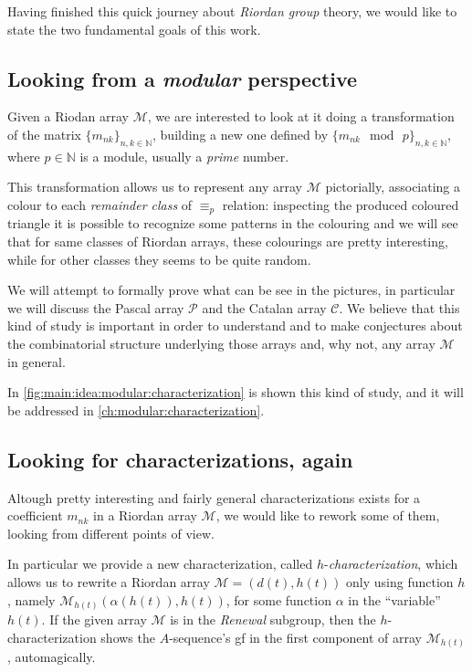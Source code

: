 
Having finished this quick journey about \emph{Riordan group} theory,
we would like to state the two fundamental goals of this work.

\subsection{Looking from a \emph{modular} perspective}

Given a Riodan array $\mathcal{M}$, we are interested to look at it
doing a transformation of the matrix $\lbrace m_{nk}\rbrace_{n,k\in\mathbb{N}}$,
building a new one defined by $\lbrace m_{nk}\mod\,p\rbrace_{n,k\in\mathbb{N}}$,
where $p\in\mathbb{N}$ is a module, usually a \emph{prime} number.

This transformation allows us to represent any array $\mathcal{M}$ pictorially,
associating a colour to each \emph{remainder class} of $\equiv_{p}$ relation:
inspecting the produced coloured triangle it is possible to recognize some
patterns in the colouring and we will see that for same classes of Riordan
arrays, these colourings are pretty interesting, while for other classes they
seems to be quite random.

We will attempt to formally prove what can be see in the pictures, in
particular we will discuss the Pascal array $\mathcal{P}$ and the Catalan array
$\mathcal{C}$.  We believe that this kind of study is important in order to
understand and to make conjectures about the combinatorial structure underlying
those arrays and, why not, any array $\mathcal{M}$ in general.



In \autoref{fig:main:idea:modular:characterization} is shown this kind of study,
and it will be addressed in \autoref{ch:modular:characterization}.

\subsection{Looking for characterizations, again}

Altough pretty interesting and fairly general characterizations exists for
a coefficient $m_{nk}$ in a Riordan array $\mathcal{M}$, we would like to
rework some of them, looking from different points of view.

In particular we provide a new characterization, called $h$-\emph{characterization},
which allows us to rewrite a Riordan array $\mathcal{M}=(d(t),h(t))$ only
using function $h$, namely $\mathcal{M}_{h(t)}(\alpha(h(t)),h(t))$, for some
function $\alpha$ in the ``variable'' $h(t)$. If the given array $\mathcal{M}$
is in the \emph{Renewal} subgroup, then the $h$-characterization shows the $A$-sequence's
\ac{gf} in the first component of array $\mathcal{M}_{h(t)}$, automagically.

